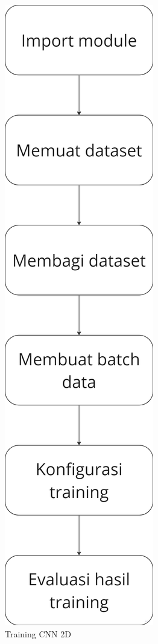 \begin{figure} [H] \centering
  \includegraphics[scale=0.1]{gambar/bab3/trainingcnn.png}
  \caption{Training CNN 2D}
  \label{fig:trainingcnn}
\end{figure}

